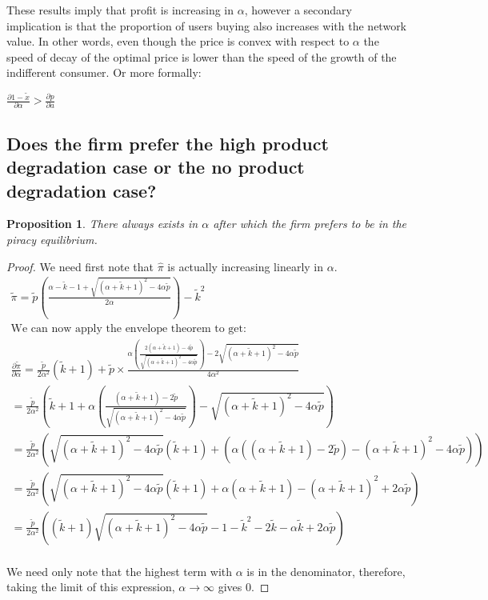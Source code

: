 \documentclass{article}
\newtheorem{proposition}{Proposition}
\begin{document}
These results imply that profit is increasing in $\alpha$, however a secondary implication is that the proportion of users buying also increases with the network value. In other words, even though the price is convex with respect to $\alpha$ the speed of decay of the optimal price is lower than the speed of the growth of the indifferent consumer. Or more formally: 

$\frac{\partial 1-\tilde{x}}{\partial \alpha} > \frac{\partial p}{\partial a}$

\subsection{Does the firm prefer the high product degradation case or the no product degradation case? }

\begin{proposition}
There always exists in $\alpha$ after which the firm prefers to be in the piracy equilibrium.
\end{proposition}

\begin{proof}
We need first note that $\hat{\pi}$ is actually increasing linearly in $\alpha$. 
\begin{align*}
\tilde{\pi} = \tilde{p} \left(\frac{\alpha-\tilde{k}-1+\sqrt{(\alpha+\tilde{k}+1)^2-4\alpha \tilde{p}}}{2 \alpha} \right) - \tilde{k}^2
\\
\text{We can now apply the envelope theorem to get:}
\\
\frac{\partial \tilde{\pi}}{\partial \alpha} = \frac{\tilde{p}}{2 \alpha^2}\left(
\tilde{k}+1
\right) 
+
\tilde{p} \times \frac{\alpha \left(\frac{2(\alpha+\tilde{k}+1)-4\tilde{p}}{\sqrt{(\alpha+ \tilde{k} +1)^2-4\alpha \tilde{p}}} \right)-2 \sqrt{(\alpha+ \tilde{k} +1)^2-4\alpha \tilde{p}}}{4 \alpha^2}
\\
= \frac{\tilde{p}}{2 \alpha^2}\left(
\tilde{k}+1
+ \alpha \left(\frac{(\alpha+\tilde{k}+1)-2\tilde{p}}{\sqrt{(\alpha+ \tilde{k} +1)^2-4\alpha \tilde{p}}} \right)- \sqrt{(\alpha+ \tilde{k} +1)^2-4\alpha \tilde{p}}
\right) \\
= \frac{\tilde{p}}{2 \alpha^2}\left(
\sqrt{(\alpha+ \tilde{k} +1)^2-4\alpha \tilde{p}} \left(\tilde{k}+1 \right)
+ (\alpha \left((\alpha+\tilde{k}+1)-2\tilde{p} \right)- (\alpha+ \tilde{k} +1)^2-4\alpha \tilde{p})
\right) 
\\
= \frac{\tilde{p}}{2 \alpha^2}\left(
\sqrt{(\alpha+ \tilde{k} +1)^2-4\alpha \tilde{p}} \left(\tilde{k}+1 \right)
+ \alpha (\alpha+\tilde{k}+1) - (\alpha+ \tilde{k} +1)^2 + 2 \alpha \tilde{p}
\right) \\
= \frac{\tilde{p}}{2 \alpha^2}\left(
\left(\tilde{k}+1 \right) \sqrt{(\alpha+ \tilde{k} +1)^2-4\alpha \tilde{p}} 
-1 - \tilde{k}^2 -2 \tilde{k} - \alpha \tilde{k} + 2\alpha \tilde{p}
\right) \\
\end{align*}

We need only note that the highest term with $\alpha$ is in the denominator, therefore, taking the limit of this expression, $\alpha \rightarrow \infty$ gives 0. 
\end{proof}
\end{document}
